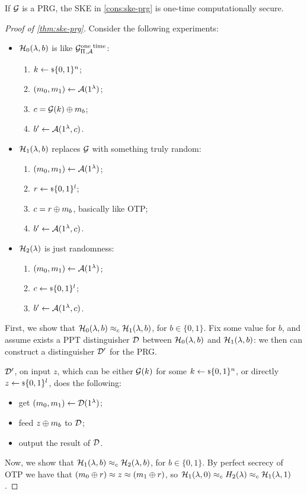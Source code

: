 \begin{theorem} \label{thm:ske-prg}
	If $\mathcal{G}$ is a \ac{PRG}, the \ac{SKE} in \cref{cons:ske-prg} is one-time computationally secure.
\end{theorem}

\begin{proof}[Proof of \cref{thm:ske-prg}]
	Consider the following experiments:
	\begin{itemize}
		\item $\mathcal{H}_0(\lambda, b)$ is like $\mathcal{G}^{\scriptstyle \text{one time}}_{\Pi_{}, \mathcal{A}}$:
		\begin{enumerate}
			\item $k \leftarrow {\scriptstyle \$} {\{0,1\}^{n}}$;
			\item $(m_0, m_1) \leftarrow \mathcal{A}(1^{\lambda})$;
			\item $c = \mathcal{G}(k) \oplus m_b$;
			\item $b' \leftarrow \mathcal{A}(1^{\lambda}, c)$.
		\end{enumerate}
		\item $\mathcal{H}_1(\lambda, b)$ replaces $\mathcal{G}$ with something truly random:
		\begin{enumerate}
			\item $(m_0, m_1) \leftarrow \mathcal{A}(1^{\lambda})$;
			\item $r \leftarrow {\scriptstyle \$} {\{0,1\}^{l}}$;
			\item $c = r \oplus m_b$, basically like \ac{OTP};
			\item $b' \leftarrow \mathcal{A}(1^{\lambda}, c)$.
		\end{enumerate}
		\item $\mathcal{H}_2(\lambda)$ is just randomness:
		\begin{enumerate}
			\item $(m_0, m_1) \leftarrow \mathcal{A}(1^{\lambda})$;
			\item $c \leftarrow {\scriptstyle \$} {\{0,1\}^{l}}$;
			\item $b' \leftarrow \mathcal{A}(1^{\lambda}, c)$.
		\end{enumerate}
	\end{itemize}

	First, we show that $\mathcal{H}_0(\lambda, b) \approx_c \mathcal{H}_1(\lambda, b)$, for $b \in \{0,1\}$.
	Fix some value for $b$, and assume exists a \ac{PPT} distinguisher $\mathcal{D}$ between $\mathcal{H}_0(\lambda, b)$ and $\mathcal{H}_1(\lambda, b)$: we then can construct a distinguisher $\mathcal{D}'$ for the \ac{PRG}.

	$\mathcal{D}'$, on input $z$, which can be either $\mathcal{G}(k)$ for some $k \leftarrow {\scriptstyle \$} {\{0,1\}^{n}}$, or directly $z \leftarrow {\scriptstyle \$} {\{0,1\}^{l}}$, does the following:
	\begin{itemize}
		\item get $(m_0, m_1) \leftarrow \mathcal{D}(1^{\lambda})$;
		\item feed $z \oplus m_b$ to $\mathcal{D}$;
		\item output the result of $\mathcal{D}$.
	\end{itemize}

	Now, we show that $\mathcal{H}_1(\lambda, b) \approx_c \mathcal{H}_2(\lambda, b)$, for $b \in \{0,1\}$.
	By perfect secrecy of \ac{OTP} we have that $(m_0 \oplus r) \approx z \approx (m_1 \oplus r)$, so $\mathcal{H}_1(\lambda, 0) \approx_c H_2(\lambda) \approx_c \mathcal{H}_1(\lambda, 1)$.
\end{proof}


